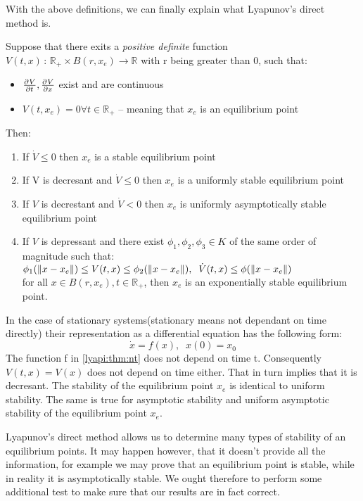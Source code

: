 With the above definitions, we can finally explain what Lyapunov's direct method is.
{
    Suppose that there exits a \textit{positive definite} function $V(t,x)\,:\,\mathbb{R}_+\times B(r,x_e) \longrightarrow \mathbb{R} $ with r being greater than 0, such that:
    \begin{itemize}
            \item $ \frac{\partial^{}V}{\partial t^{}}, \frac{\partial^{}V}{\partial x^{}}$ exist and are continuous
            \item $V(t,x_e) = 0 \forall t\in \mathbb{R}_+ $ -- meaning that $x_e$ is an equilibrium point
            
    \end{itemize}
    Then:
    \begin{enumerate}
        \item If $\dot{V} \le 0$ then $x_e$ is a stable equilibrium point
        \item If V is decresant and $\dot{V} \le 0 $ then $x_e$ is a uniformly stable equilibrium point
        \item If $V$ is decrestant and  $\dot{V} < 0$ then $x_e$ is uniformly asymptotically stable equilibrium point
        \item If $V$ is depressant and there exist $\phi_1,  \phi_2, \phi_3 \in K$ of the same order of magnitude such that:\\
            $\phi_1(\lVert x-x_e\rVert) \le V(t,x) \le \phi_2(\lVert x-x_e\rVert),\; \; \dot{V}(t,x) \le \phi(\lVert x-x_e\rVert)$ \\
            for all $x \in B(r,x_e), t \in \mathbb{R}_+$, then $x_e$ is an exponentially stable equilibrium point.
    \end{enumerate}

   \nt
   {
        In the case of stationary systems(stationary means not dependant on time directly) their representation as a differential equation has the 
        following form:
        \begin{equation}
            \label{lyapi:thm:nt}
            \dot{x} = f(x),\;\; x(0) = x_0
        \end{equation}
        The function f in  \ref{lyapi:thm:nt} does not depend on time t. Consequently $V(t,x) = V(x)$ does not depend on time either. That in turn implies that
        it is decresant. The stability of the equilibrium point $x_e$ is identical to uniform stability. The same is true for asymptotic stability and uniform asymptotic stability of the equilibrium point $x_e$.
   }
}
Lyapunov's direct method allows us to determine many types of stability of an equilibrium points. It may happen however, that it doesn't provide all the information, for example we may prove that an equilibrium point is stable, while in reality it is asymptotically stable. We ought therefore to perform some additional test to make sure that our results are in fact correct.

